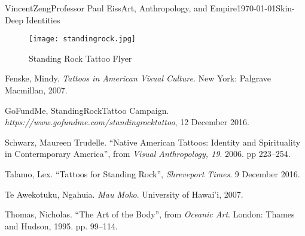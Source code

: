 \documentclass[12pt]{article}
\begin{document}
\begin{mla}{Vincent}{Zeng}{Professor Paul Eiss}{Art, Anthropology, and
  Empire}{\today}{Skin-Deep Identities}

  

  \newpage

  \begin{figure}[ht!]
      \centering
      \texttt{[image: standingrock.jpg]}
      \caption{Standing Rock Tattoo Flyer\label{overflow}}
  \end{figure}

\begin{workscited}
  \bibent
  Fenske, Mindy. \textit{Tattoos in American Visual Culture}. New York: Palgrave
  Macmillan, 2007.

  \bibent
  GoFundMe, StandingRockTattoo Campaign.
  \textit{https://www.gofundme.com/standingrocktattoo}, 12 December 2016.

  \bibent
  Schwarz, Maureen Trudelle. ``Native American Tattoos: Identity and
  Spirituality in Contermporary America'', from \textit{Visual Anthropology,
  19}. 2006. pp 223--254.

  \bibent
  Talamo, Lex. ``Tattoos for Standing Rock'', \textit{Shreveport Times}. 9
  December 2016.

  \bibent
  Te Awekotuku, Ngahuia. \textit{Mau Moko}. University of Hawai'i, 2007.

  \bibent
  Thomas, Nicholas. ``The Art of the Body'', from \textit{Oceanic Art}. London:
  Thames and Hudson, 1995. pp.  99--114.

\end{workscited}
\end{mla}
\end{document}
